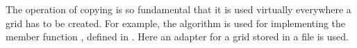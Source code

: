 
The operation of copying is so fundamental that
it is used virtually everywhere a grid has to be created.
For example, the algorithm is used for implementing 
the member function , 
defined in .
Here an adapter 
for a grid stored in a file is used.


